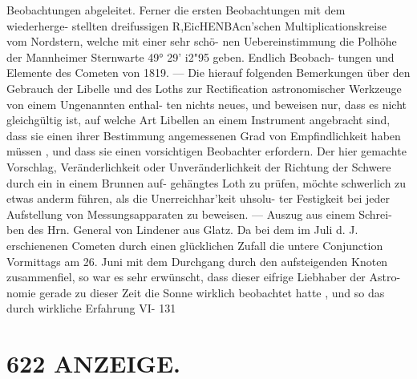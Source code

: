 \documentclass[12pt,a4paper]{article}
\begin{document}
{{{{{{{{Beobachtungen  abgeleitet.  Ferner  die  ersten  Beobachtungen  mit  dem  wiederherge- stellten dreifussigen  R,EicHENBAcn'schen  Multiplicationskreise  vom  Nordstern,  welche  mit  einer  sehr  schö- nen Uebereinstimmung  die  Polhöhe  der  Mannheimer  Sternwarte  49°  29'  i2"95  geben.  Endlich  Beobach- tungen und  Elemente  des  Cometen  von  1819.  ---  Die  hierauf  folgenden  Bemerkungen  über  den  Gebrauch der  Libelle  und  des  Loths  zur  Rectification  astronomischer  Werkzeuge  von  einem  Ungenannten  enthal- ten nichts  neues,  und  beweisen  nur,  dass  es  nicht  gleichgültig  ist,  auf  welche  Art  Libellen  an  einem Instrument  angebracht  sind,  dass  sie  einen  ihrer  Bestimmung  angemessenen  Grad  von  Empfindlichkeit haben  müssen ,  und  dass  sie  einen  vorsichtigen  Beobachter  erfordern.  Der  hier  gemachte  Vorschlag, Veränderlichkeit  oder  Unveränderlichkeit  der  Richtung  der  Schwere  durch  ein  in  einem  Brunnen  auf- gehängtes Loth  zu  prüfen,  möchte  schwerlich  zu  etwas  anderm  führen,  als  die  Unerreichhar'keit  uhsolu- ter  Festigkeit  bei  jeder  Aufstellung  von  Messungsapparaten  zu  beweisen.  ---  Auszug  aus  einem  Schrei- ben des  Hrn.  General  von  Lindener  aus  Glatz.  Da  bei  dem  im  Juli  d.  J.  erschienenen  Cometen  durch einen  glücklichen  Zufall  die  untere  Conjunction  Vormittags  am  26.  Juni  mit  dem  Durchgang  durch  den aufsteigenden  Knoten  zusammenfiel,  so  war  es  sehr  erwünscht,  dass  dieser  eifrige  Liebhaber  der  Astro- nomie gerade  zu  dieser  Zeit  die  Sonne  wirklich  beobachtet  hatte ,  und  so  das  durch  wirkliche  Erfahrung VI-  131


\section*{622  ANZEIGE.}

}}}}}}}}
\end{document}
